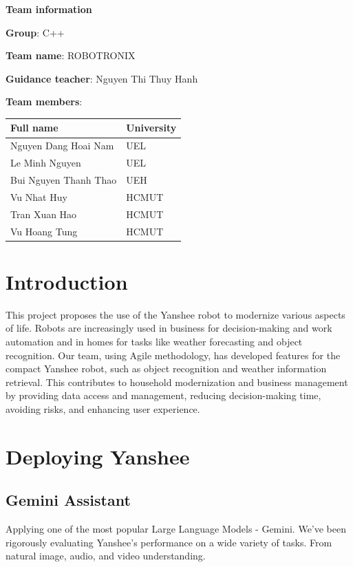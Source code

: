 \documentclass[12pt, a4paper]{article}
\begin{document}
\newpage
\thispagestyle{empty}
\textbf{Team information}

\textbf{Group}: C++

\textbf{Team name}: ROBOTRONIX

\textbf{Guidance teacher}: Nguyen Thi Thuy Hanh

\textbf{Team members}:\\

\begin{tabularx}{1\textwidth} { 
    | >{\raggedright\arraybackslash}X 
    | >{\raggedright\arraybackslash}X  |}
   \hline
   \textbf{Full name} & \textbf{University} \\ \hline
    Nguyen Dang Hoai Nam & UEL \\ \hline
    Le Minh Nguyen & UEL \\ \hline
    Bui Nguyen Thanh Thao & UEH \\ \hline
    Vu Nhat Huy & HCMUT \\ \hline
    Tran Xuan Hao & HCMUT \\ \hline
    Vu Hoang Tung & HCMUT \\ \hline
  \end{tabularx}
\newpage
\thispagestyle{empty}
{
  \tableofcontents
}
\onehalfspacing
\newpage
\setcounter{page}{1}
\section{Introduction}
This project proposes the use of the Yanshee robot to modernize various aspects of life. Robots are increasingly used in business for decision-making and work automation and in homes for tasks like weather forecasting and object recognition. Our team, using Agile methodology, has developed features for the compact Yanshee robot, such as object recognition and weather information retrieval. This contributes to household modernization and business management by providing data access and management, reducing decision-making time, avoiding risks, and enhancing user experience.
\section{Deploying Yanshee}
\subsection{Gemini Assistant}
Applying one of the most popular Large Language Models - Gemini. We've been rigorously evaluating Yanshee's performance on a wide variety of tasks. From natural image, audio, and video understanding. 
\end{document}
